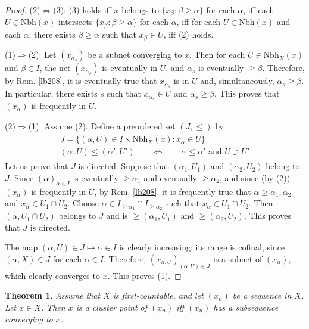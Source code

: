 \documentclass[12pt,b5paper,notitlepage]{article}
\theoremstyle{definition}
\theoremstyle{plain}
\newtheorem{thm}[df]{Theorem}
\newcommand{\ovl}{\overline}
\newcommand{\Nbh}{\mathrm{Nbh}}
\numberwithin{equation}{section}
\begin{document}
\begin{proof}
(2)$\Leftrightarrow$(3): (3) holds iff $x$ belongs to $\ovl{\{x_\beta:\beta\geq\alpha\}}$ for each $\alpha$, iff each $U\in\Nbh(x)$ intersects $\{x_\beta:\beta\geq\alpha\}$ for each $\alpha$, iff for each $U\in\Nbh(x)$ and each $\alpha$, there exists $\beta\geq\alpha$ such that $x_\beta\in U$, iff (2) holds.

(1)$\Rightarrow$(2): Let $(x_{\alpha_s})$ be a subnet converging to $x$. Then for each $U\in\Nbh_X(x)$ and $\beta\in I$, the net $(x_{\alpha_s})$ is eventually in $U$, and $\alpha_s$ is eventually $\geq\beta$. Therefore, by Rem. \ref{lb208}, it is eventually true that $x_{\alpha_s}$ is in $U$ and, simultaneously,  $\alpha_s\geq\beta$. In particular, there exists $s$ such that $x_{\alpha_s}\in U$ and $\alpha_s\geq\beta$. This proves that $(x_\alpha)$ is frequently in $U$.

(2)$\Rightarrow$(1): Assume (2). Define a preordered set $(J,\leq)$ by
\begin{gather}
\begin{gathered}
J=\{(\alpha,U)\in I\times\Nbh_X(x):x_\alpha\in U \}\\[0.5ex]
(\alpha,U)\leq (\alpha',U')\qquad\Longleftrightarrow\qquad \alpha\leq \alpha'\text{ and }U\supset U'
\end{gathered}
\end{gather}
Let us prove that $J$ is directed: Suppose that $(\alpha_1,U_1)$ and $(\alpha_2,U_2)$ belong to $J$. Since $(\alpha)_{\alpha\in I}$ is eventually $\geq\alpha_1$ and eventually $\geq\alpha_2$, and since (by (2)) $(x_\alpha)$ is frequently in $U$, by Rem. \ref{lb208}, it is frequently true that $\alpha\geq\alpha_1,\alpha_2$ and $x_\alpha\in U_1\cap U_2$. Choose $\alpha\in I_{\geq\alpha_1}\cap I_{\geq\alpha_2}$ such that $x_\alpha\in U_1\cap U_2$. Then $(\alpha,U_1\cap U_2)$ belongs to $J$ and is $\geq(\alpha_1,U_1)$ and $\geq(\alpha_2,U_2)$. This proves that $J$ is directed.


The map $(\alpha,U)\in J\mapsto \alpha\in I$ is clearly increasing; its range is cofinal, since $(\alpha,X)\in J$ for each $\alpha\in I$. Therefore, $(x_{\alpha,U})_{(\alpha,U)\in J}$ is a subnet of $(x_\alpha)$, which clearly converges to $x$. This proves (1).
\end{proof}

\begin{thm}\label{lb218}
Assume that $X$ is first-countable, and let $(x_n)$ be a sequence in $X$. Let $x\in X$. Then $x$ is a cluster point of $(x_n)$ iff $(x_n)$ has a subsequence converging to $x$.
\end{thm}
\end{document}
